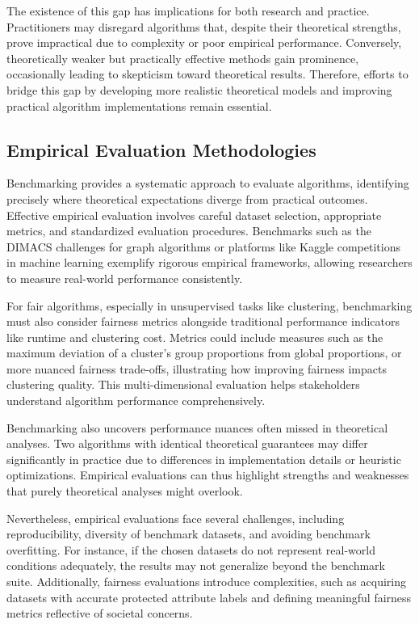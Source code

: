 The existence of this gap has implications for both research and
practice. Practitioners may disregard algorithms that, despite their
theoretical strengths, prove impractical due to complexity or poor
empirical performance. Conversely, theoretically weaker but
practically effective methods gain prominence, occasionally leading
to skepticism toward theoretical results. Therefore, efforts to
bridge this gap by developing more realistic theoretical models and
improving practical algorithm implementations remain essential.

\subsection{Empirical Evaluation Methodologies}

Benchmarking provides a systematic approach to evaluate algorithms,
identifying precisely where theoretical expectations diverge from
practical outcomes. Effective empirical evaluation involves careful
dataset selection, appropriate metrics, and standardized evaluation
procedures. Benchmarks such as the DIMACS challenges for graph
algorithms or platforms like Kaggle competitions in machine learning
exemplify rigorous empirical frameworks, allowing researchers to
measure real-world performance consistently.

For fair algorithms, especially in unsupervised tasks like
clustering, benchmarking must also consider fairness metrics
alongside traditional performance indicators like runtime and
clustering cost. Metrics could include measures such as the maximum
deviation of a cluster’s group proportions from global proportions,
or more nuanced fairness trade-offs, illustrating how improving
fairness impacts clustering quality. This multi-dimensional
evaluation helps stakeholders understand algorithm performance comprehensively.

Benchmarking also uncovers performance nuances often missed in
theoretical analyses. Two algorithms with identical theoretical
guarantees may differ significantly in practice due to differences in
implementation details or heuristic optimizations. Empirical
evaluations can thus highlight strengths and weaknesses that purely
theoretical analyses might overlook.

Nevertheless, empirical evaluations face several challenges,
including reproducibility, diversity of benchmark datasets, and
avoiding benchmark overfitting. For instance, if the chosen datasets
do not represent real-world conditions adequately, the results may
not generalize beyond the benchmark suite. Additionally, fairness
evaluations introduce complexities, such as acquiring datasets with
accurate protected attribute labels and defining meaningful fairness
metrics reflective of societal concerns.

